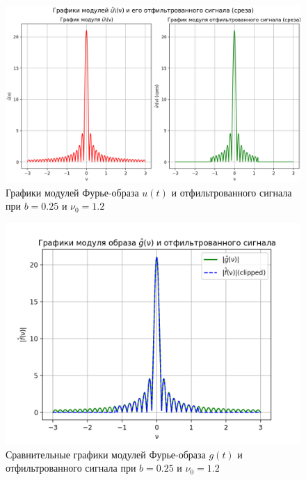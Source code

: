 \begin{figure}[ht!]
    \centering
    \includegraphics[scale=0.55]{media/1 task/high_freq/Fourier_Image_0,25_-1,1981981981981982.png}
    \caption{Графики модулей Фурье-образа $u(t)$ и отфильтрованного сигнала при $b=0.25$ и $\nu_0=1.2$}
    \label{fig:four_025_12}
\end{figure}

\begin{figure}[ht!]
    \centering
    \includegraphics[scale=0.55]{media/1 task/high_freq/Fourier_Image_Comparison_0,25_-1,1981981981981982.png}
    \caption{Сравнительные графики модулей Фурье-образа $g(t)$ и отфильтрованного сигнала при $b=0.25$ и $\nu_0=1.2$}
    \label{fig:fourc_025_12}
\end{figure}

\clearpage

